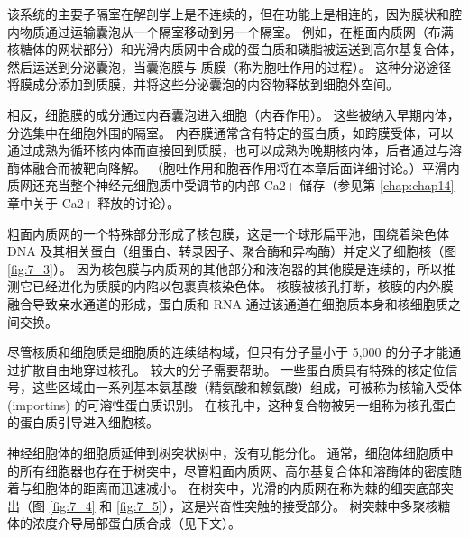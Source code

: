该系统的主要子隔室在解剖学上是不连续的，但在功能上是相连的，因为膜状和腔内物质通过运输囊泡从一个隔室移动到另一个隔室。 
例如，在粗面内质网（布满核糖体的网状部分）和光滑内质网中合成的蛋白质和磷脂被运送到高尔基复合体，然后运送到分泌囊泡，当囊泡膜与 质膜（称为胞吐作用的过程）。 
这种分泌途径将膜成分添加到质膜，并将这些分泌囊泡的内容物释放到细胞外空间。


相反，细胞膜的成分通过内吞囊泡进入细胞（内吞作用）。 
这些被纳入早期内体，分选集中在细胞外围的隔室。 
内吞膜通常含有特定的蛋白质，如跨膜受体，可以通过成熟为循环核内体而直接回到质膜，也可以成熟为晚期核内体，后者通过与溶酶体融合而被靶向降解。 
（胞吐作用和胞吞作用将在本章后面详细讨论。）平滑内质网还充当整个神经元细胞质中受调节的内部 Ca2+ 储存（参见第 \ref{chap:chap14} 章中关于 Ca2+ 释放的讨论）。


粗面内质网的一个特殊部分形成了核包膜，这是一个球形扁平池，围绕着染色体 DNA 及其相关蛋白（组蛋白、转录因子、聚合酶和异构酶）并定义了细胞核（图 \ref{fig:7_3}）。 
因为核包膜与内质网的其他部分和液泡器的其他膜是连续的，所以推测它已经进化为质膜的内陷以包裹真核染色体。 
核膜被核孔打断，核膜的内外膜融合导致亲水通道的形成，蛋白质和 RNA 通过该通道在细胞质本身和核细胞质之间交换。


尽管核质和细胞质是细胞质的连续结构域，但只有分子量小于 5,000 的分子才能通过扩散自由地穿过核孔。 
较大的分子需要帮助。 
一些蛋白质具有特殊的核定位信号，这些区域由一系列基本氨基酸（精氨酸和赖氨酸）组成，可被称为核输入受体 (importins) 的可溶性蛋白质识别。 
在核孔中，这种复合物被另一组称为核孔蛋白的蛋白质引导进入细胞核。


神经细胞体的细胞质延伸到树突状树中，没有功能分化。 
通常，细胞体细胞质中的所有细胞器也存在于树突中，尽管粗面内质网、高尔基复合体和溶酶体的密度随着与细胞体的距离而迅速减小。 
在树突中，光滑的内质网在称为棘的细突底部突出（图 \ref{fig:7_4} 和 \ref{fig:7_5}），这是兴奋性突触的接受部分。 树突棘中多聚核糖体的浓度介导局部蛋白质合成（见下文）。

